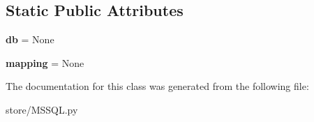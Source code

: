 \subsection*{Static Public Attributes}
\begin{DoxyCompactItemize}
\item 
\hypertarget{classstore_1_1_m_s_s_q_l_1_1_m_s_s_q_l_store_a54c1a157959c7175f76ee41ebebc6166}{{\bfseries db} = None}\label{classstore_1_1_m_s_s_q_l_1_1_m_s_s_q_l_store_a54c1a157959c7175f76ee41ebebc6166}

\item 
\hypertarget{classstore_1_1_m_s_s_q_l_1_1_m_s_s_q_l_store_a2c5150fd036ade465b9e6a23182b0e93}{{\bfseries mapping} = None}\label{classstore_1_1_m_s_s_q_l_1_1_m_s_s_q_l_store_a2c5150fd036ade465b9e6a23182b0e93}

\end{DoxyCompactItemize}


The documentation for this class was generated from the following file\-:\begin{DoxyCompactItemize}
\item 
store/M\-S\-S\-Q\-L.\-py\end{DoxyCompactItemize}
